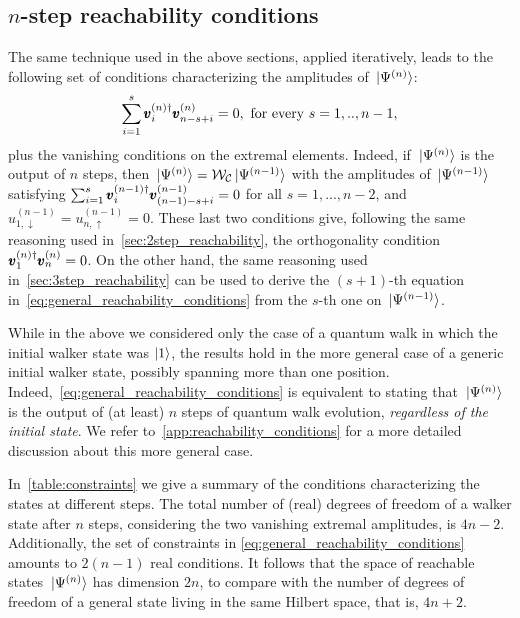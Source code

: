 \subsection{\texorpdfstring{$n$-step}{n-step} reachability conditions}
The same technique used in the above sections, applied iteratively, leads to the following set of conditions characterizing the amplitudes of $\ket*{\Psi^{(n)}}$:
\begin{equation}
	\sum_{i=1}^s \pmb{v}_i^{(n)\dagger} \pmb{v}^{(n)}_{n-s+i} = 0,
	\text{ for every } s=1,..,n-1,
	\label{eq:general_reachability_conditions}
\end{equation}
plus the vanishing conditions on the extremal elements.
Indeed, if $\ket*{\Psi^{(n)}}$ is the output of $n$ steps, then $\ket*{\Psi^{(n)}} = \mathcal W_{\mathcal C}\ket*{\Psi^{(n-1)}}$ with the amplitudes of $\ket*{\Psi^{(n-1)}}$ satisfying
$\sum_{i=1}^s \pmb{v}_i^{(n-1)\dagger} \pmb{v}_{(n-1)-s+i}^{(n-1)} = 0$
for all $s=1,...,n-2$,
and $u_{1,\downarrow}^{(n-1)} = u_{n, \uparrow}^{(n-1)} = 0$.
These last two conditions give, following the same reasoning used in~\cref{sec:2step_reachability}, the orthogonality condition $\pmb{v}_1^{(n)\dagger} \pmb{v}_n^{(n)} = 0$.
On the other hand, the same reasoning used in~\cref{sec:3step_reachability} can be used to derive the $(s+1)$-th equation in~\cref{eq:general_reachability_conditions} from the $s$-th one on $\ket*{\Psi^{(n-1)}}$.

While in the above we considered only the case of a quantum walk in which the initial walker state was $\ket1$, 
the results hold in the more general case of a generic initial walker state, possibly spanning more than one position.
Indeed,~\cref{eq:general_reachability_conditions} is equivalent to stating that $\ket*{\Psi^{(n)}}$ is the output of (at least) $n$ steps of quantum walk evolution, \textit{regardless of the initial state}.
We refer to~\cref{app:reachability_conditions} for a more detailed discussion about this more general case.

In~\cref{table:constraints} we give a summary of the conditions characterizing the states at different steps.
The total number of (real) degrees of freedom of a walker state after $n$ steps, considering the two vanishing extremal amplitudes, is $4n - 2$.
Additionally, the set of constraints in \cref{eq:general_reachability_conditions} amounts to $2(n-1)$ real conditions.
It follows that the space of reachable states $\ket*{\Psi^{(n)}}$ has dimension $2n$, to compare with the number of degrees of freedom of a general state living in the same Hilbert space, that is, $4n + 2$.

